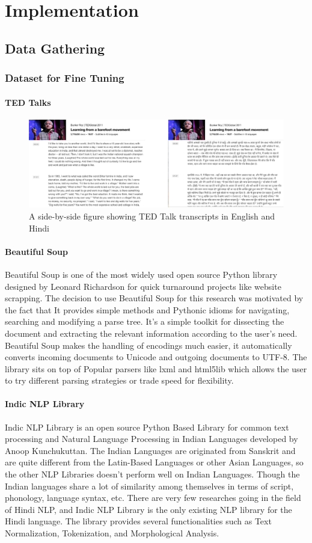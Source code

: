 \chapter{Implementation}
\section{Data Gathering}
\subsection{Dataset for Fine Tuning}
\subsubsection{TED Talks}
\begin{figure}
\includegraphics[width=\textwidth]{figures/tedtalks.png}
\caption{A side-by-side figure showing TED Talk transcripts in English and Hindi} \label{fig1}
\end{figure}
\subsubsection{Beautiful Soup}
Beautiful Soup is one of the most widely used open source Python library designed by Leonard Richardson for quick turnaround projects like website scrapping. The decision to use Beautiful Soup for this research was motivated by the fact that It provides simple methods and Pythonic idioms for navigating, searching and modifying a parse tree. It’s a simple toolkit for dissecting the document and extracting the relevant information according to the user’s need. Beautiful Soup makes the handling of encodings much easier, it automatically converts incoming documents to Unicode and outgoing documents to UTF-8. The library sits on top of Popular parsers like lxml and html5lib which allows the user to try different parsing strategies or trade speed for flexibility. 
\subsubsection{Indic NLP Library}
Indic NLP Library is an open source Python Based Library for common text processing and Natural Language Processing in Indian Languages developed by Anoop Kunchukuttan.  The Indian Languages are originated from Sanskrit and are quite different from the Latin-Based Languages or other Asian Languages, so the other NLP Libraries doesn’t perform well on Indian Languages. Though the Indian languages share a lot of similarity among themselves in terms of script, phonology, language syntax, etc. There are very few researches going in the field of Hindi NLP, and Indic NLP Library is the only existing NLP library for the Hindi language. The library provides several functionalities such as Text Normalization, Tokenization, and Morphological Analysis.
